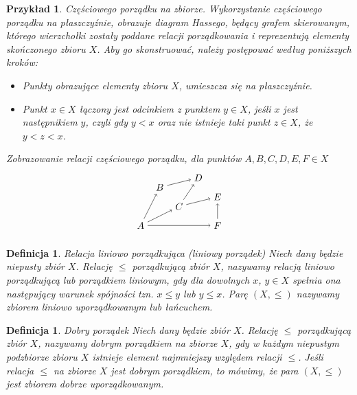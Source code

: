 \documentclass[12pt,a4paper]{report}
\newtheorem{definition}[theorem]{Definicja}
\newtheorem{example}{Przykład}
\begin{document}
\begin{example}{Częściowego porządku na zbiorze.}
Wykorzystanie częściowego porządku na płaszczyźnie, obrazuje diagram Hassego, będący grafem skierowanym, którego wierzchołki zostały poddane relacji porządkowania i reprezentują elementy  skończonego zbioru $X$. 
Aby go skonstruować, należy postępować według poniższych kroków:
\begin{itemize}
\item Punkty obrazujące elementy zbioru $X$, umieszcza się na płaszczyźnie.
\item Punkt $x\in X$ łączony jest odcinkiem z punktem $y \in X$, jeśli $x$ jest następnikiem $y$, czyli gdy $y <x$ oraz nie istnieje taki punkt $z \in X$, że $y<z<x$.
\end{itemize}
Zobrazowanie relacji częściowego porządku, dla punktów $A, B, C, D, E, F \in X$
$$
\begin{tikzpicture}[scale=.7]
  \node (A) at (-1,0) {$A$};
  \node (B) at (0,2) {$B$};
  \node (C) at (1,1) {$C$};
 \node (E) at (3,1.5) {$E$};
 \node (F) at (3,0) {$F$};
 \node (D) at (2,2.5) {$D$};
 \draw [->](A) --(C);
 \draw [->](A) --(B);
 \draw [->](B) --(D);
 \draw [->](C) --(D);
 \draw [->](C) --(E);
 \draw [->](A) --(F);
 \draw [->](F) --(E);
 
\end{tikzpicture}
$$
\end{example}


\begin{definition}{Relacja liniowo porządkująca (liniowy porządek) \cite[Rozdział 2]{blaszczyk2007}}\label{def-porzadek-liniowy}
Niech dany będzie niepusty zbiór $X$. Relację $\leq$ porządkującą zbiór $X$, nazywamy relacją liniowo porządkującą lub porządkiem liniowym, gdy dla dowolnych $x$, $y \in X$ spełnia ona następujący warunek spójności tzn. $x \leq y$ lub $y \leq x$. Parę $(X, \leq)$ nazywamy zbiorem liniowo uporządkowanym lub łańcuchem.
\end{definition}


\begin{definition}{Dobry porządek \cite[Rozdział 2]{blaszczyk2007}}
Niech dany będzie zbiór $X$. Relację $\leq$ porządkującą zbiór $X$, nazywamy dobrym porządkiem na zbiorze $X$, gdy w każdym niepustym podzbiorze zbioru $X$ istnieje element najmniejszy względem relacji $\leq$. Jeśli relacja $\leq$ na zbiorze $X$ jest dobrym porządkiem, to mówimy, że para $(X,\leq)$ jest zbiorem dobrze uporządkowanym.
\end{definition}
\end{document}
